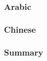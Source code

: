 



\subsubsection{Arabic}





\subsubsection{Chinese}





\subsubsection{Summary}



































